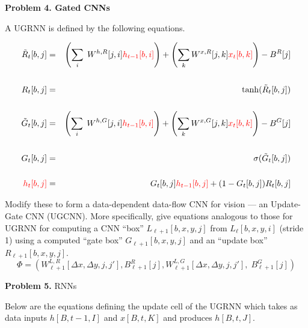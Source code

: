 \documentclass{article}
\newcommand{\solution}[1]{}
\begin{document}
\bigskip
{\bf Problem 4. Gated CNNs}

A UGRNN is defined by the following equations.

\begin{eqnarray*}
\tilde{R}_t[b,j] & = & \left(\sum_i\;W^{h,R}[j,i]{\color{red} h_{t-1}[b,i]}\right) + \left(\sum_k W^{x,R}[j,k]{\color{red} x_t[b,k]}\right) - B^R[j] \\
\\
R_t[b,j] & = & \mathrm{\tanh}(\tilde{R}_t[b,j]) \\
\\
\tilde{G}_t[b,j] & = & \left(\sum_i\;W^{h,G}[j,i]{\color{red} h_{t-1}[b,i]}\right) + \left(\sum_k W^{x,G}[j,k]{\color{red} x_t[b,k]}\right) - B^G[j] \\
\\
G_t[b,j] & = & \mathrm{\sigma}(\tilde{G}_t[b,j]) \\
\\
{\color{red} h_t[b,j]} & = & G_t[b,j]{\color{red} h_{t-1}[b,j]} + (1-G_t[b,j])R_t[b,j]
\end{eqnarray*}

Modify these to form a data-dependent data-flow CNN for vision --- an Update-Gate CNN (UGCNN).
More specifically, give equations analogous to those for UGRNN for computing a CNN ``box'' $L_{\ell+1}[b,x,y,j]$ from $L_\ell[b,x,y,i]$ (stride 1) using a computed ``gate box'' $G_{\ell+1}[b,x,y,j]$ and an ``update box'' $R_{\ell+1}[b,x,y,j]$.
$$\Phi = (W^{L,R}_{\ell+1}[\Delta x, \Delta y,j,j'], B^R_{\ell+1}[j], W^{L,G}_{\ell+1}[\Delta x, \Delta y,j,j'],\;B^G_{\ell+1}[j])$$

\solution{
  \begin{eqnarray*}
    R_{\ell+1}[b,x,y,j] & = & \mathrm{tanh}\left(\left(\sum_{\Delta x,\Delta y,j'}\;W^{L,R}_{\ell+1}[\Delta x, \Delta y, j',j]
    L_{\ell}[b,x+\Delta x,\;y+\Delta y,\;j']\right) - B^R_{\ell+1}[j]\right) \\
    \\
    G_{\ell+1}[b,x,y,j] & = & \sigma\left(\left(\sum_{\Delta x,\Delta y,i}\;W^{L,G}_{\ell+1}[\Delta x, \Delta y, i,j]
    L_{\ell}[b,x+\Delta x,\;y+\Delta y,\;i]\right) - B^G_{\ell+1}[j]\right) \\
    \\
    L_{\ell+1}[b,x,y,j] & = & G_{\ell+1}[b,x,y,j]L_\ell[b,x,y,j] + (1-G_t[b,x,y,j])R_t[b,x,y,j]
  \end{eqnarray*}
}

{\bf Problem 5.} RNNs

Below are the equations defining the update cell of the UGRNN which takes as data inputs $h[B,t-1,I]$ and $x[B,t,K]$ and produces
$h[B,t,J]$.
\end{document}
